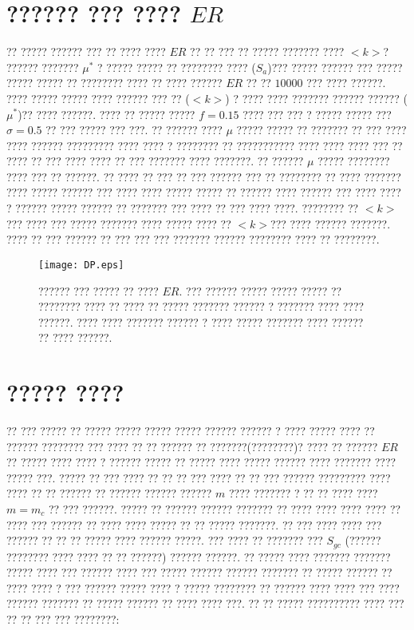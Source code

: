 \section{?????? ??? ???? $ER$}
?? ????? ?????? ???  ?? ???? ???? $ER$  ?? ?? ??? ?? ????? ??????? ???? $<k>$? ?????? ??????? $\mu^*$ ? ????? ????? ?? ???????? ????  ($S_{a}$)??? ????? ?????? ??? ????? ????? ????? ?? ???????? ???? ?? ???? ?????? $ER$ ?? ?? $10000$ ??? ???? ??????. ???? ????? ?????  ???? ?????? ??? ?? ($<k>$) ? ???? ???? ??????? ?????? ??????  ($\mu^*$)?? ???? ??????. ???? ?? ????? ????? $f = 0.15$ ???? ??? ??? ? ????? ????? ??? $\sigma = 0.5$ ?? ??? ????? ??? ???. ?? ?????? ???? $\mu$ ????? ????? ?? ??????? ?? ??? ???? ???? ?????? ????????? ???? ???? ? ???????? ?? ??????????? ???? ???? ???? ??? ?? ???? ?? ??? ???? ???? ?? ??? ??????? ???? ???????. ?? ?????? $\mu$  ????? ???????? ???? ??? ?? ??????. ?? ???? ?? ??? ?? ??? ?????? ??? ?? ???????? ?? ???? ??????? ???? ????? ?????? ??? ???? ???? ????? ????? ?? ?????? ???? ?????? ??? ???? ???? ? ?????? ????? ?????? ?? ??????? ??? ???? ?? ??? ???? ????. ???????? ?? $<k>$??? ???? ??? ????? ??????? ???? ????? ???? ?? $<k>$??? ???? ?????? ???????. ???? ?? ??? ?????? ?? ??? ??? ??? ??????? ?????? ???????? ???? ?? ????????. 
\begin{figure}[htbp]
\hspace*{0cm}
\centering
\texttt{[image: DP.eps]}
\caption [?????? ??? ????? ?? ???? $ER$]{\footnotesize ?????? ??? ????? ?? ???? $ER$. ??? ?????? ????? ????? ????? ?? ???????? ???? ?? ???? ?? ????? ??????? ?????? ? ??????? ???? ???? ??????. ???? ???? ??????? ?????? ? ???? ????? ??????? ???? ?????? ?? ???? ??????.}
\label{fig:DP}
\end{figure}


\newpage
\section{????? ????}
?? ??? ????? ?? ????? ????? ????? ????? ?????? ?????? ? ???? ????? ???? ?? ?????? ???????? ??? ???? ?? ?? ?????? ?? ???????(????????)? ???? ?? ?????? $ER$ ?? ????? ???? ???? ? ?????? ????? ?? ????? ???? ????? ?????? ???? ??????? ???? ????? ???. ????? ?? ??? ???? ?? ?? ?? ??? ???? ?? ?? ??? ?????? ????????? ???? ???? ?? ?? ?????? ?? ?????? ?????? ?????? $m$ ???? ??????? ? ?? ?? ???? ???? $m = m_{c}$ ?? ??? ??????. ????? ?? ?????? ?????? ??????? ?? ???? ???? ???? ???? ?? ???? ??? ?????? ?? ???? ???? ????? ?? ?? ????? ???????. ?? ??? ???? ???? ??? ?????? ?? ?? ?? ????? ???? ?????? ?????. ??? ???? ?? ??????? ??? $S_{gc}$ (?????? ???????? ???? ???? ?? ?? ??????) ?????? ??????. ?? ????? ???? ??????? ??????? ????? ???? ??? ?????? ???? ??? ????? ?????? ?????? ??????? ?? ?????  ?????? ?? ???? ???? ? ??? ?????? ????? ???? ? ????? ???????? ?? ?????? ???? ???? ??? ???? ?????? ??????? ?? ?????  ?????? ?? ???? ???? ???. ?? ?? ????? ?????????? ???? ??? ?? ?? ??? ??? ????????:


